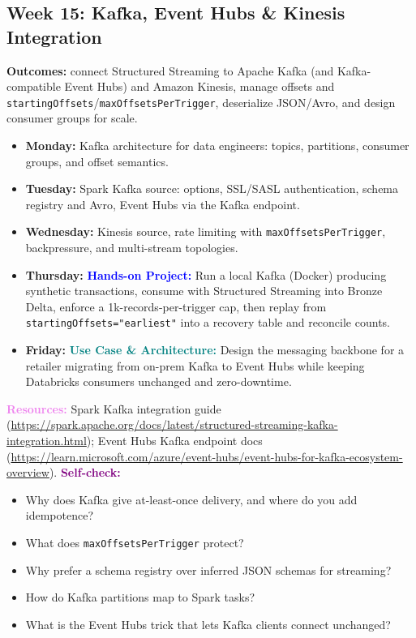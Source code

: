 \documentclass[11pt, a4paper]{article}
\newcommand{\project}[1]{\vspace{1mm}\noindent\textbf{\textcolor{blue}{Hands-on Project:}} #1}
\newcommand{\usecase}[1]{\vspace{1mm}\noindent\textbf{\textcolor{teal}{Use Case \& Architecture:}} #1}
\newcommand{\dayitem}[2]{\item \textbf{#1:} #2}
\newcommand{\resources}[1]{\vspace{1mm}\noindent\textbf{\textcolor{violet}{Resources:}} #1}
\newcommand{\selfcheck}[1]{\vspace{1mm}\noindent\textbf{\textcolor{purple}{Self-check:}} #1}
\begin{document}
\subsection*{Week 15: Kafka, Event Hubs \& Kinesis Integration}
\par\noindent\textbf{Outcomes:} connect Structured Streaming to Apache Kafka (and Kafka-compatible Event Hubs) and Amazon Kinesis, manage offsets and \texttt{startingOffsets}/\texttt{maxOffsetsPerTrigger}, deserialize JSON/Avro, and design consumer groups for scale.
\begin{itemize}[label=-]
    \dayitem{Monday}{Kafka architecture for data engineers: topics, partitions, consumer groups, and offset semantics.}
    \dayitem{Tuesday}{Spark Kafka source: options, SSL/SASL authentication, schema registry and Avro, Event Hubs via the Kafka endpoint.}
    \dayitem{Wednesday}{Kinesis source, rate limiting with \texttt{maxOffsetsPerTrigger}, backpressure, and multi-stream topologies.}
    \dayitem{Thursday}{\project{Run a local Kafka (Docker) producing synthetic transactions, consume with Structured Streaming into Bronze Delta, enforce a 1k-records-per-trigger cap, then replay from \texttt{startingOffsets="earliest"} into a recovery table and reconcile counts.}}
    \dayitem{Friday}{\usecase{Design the messaging backbone for a retailer migrating from on-prem Kafka to Event Hubs while keeping Databricks consumers unchanged and zero-downtime.}}
\end{itemize}
\resources{Spark Kafka integration guide (\url{https://spark.apache.org/docs/latest/structured-streaming-kafka-integration.html}); Event Hubs Kafka endpoint docs (\url{https://learn.microsoft.com/azure/event-hubs/event-hubs-for-kafka-ecosystem-overview}).}
\selfcheck{\begin{itemize}[label=-, leftmargin=1.5em, itemsep=0pt]
    \item Why does Kafka give at-least-once delivery, and where do you add idempotence?
    \item What does \texttt{maxOffsetsPerTrigger} protect?
    \item Why prefer a schema registry over inferred JSON schemas for streaming?
    \item How do Kafka partitions map to Spark tasks?
    \item What is the Event Hubs trick that lets Kafka clients connect unchanged?
\end{itemize}}
\end{document}
